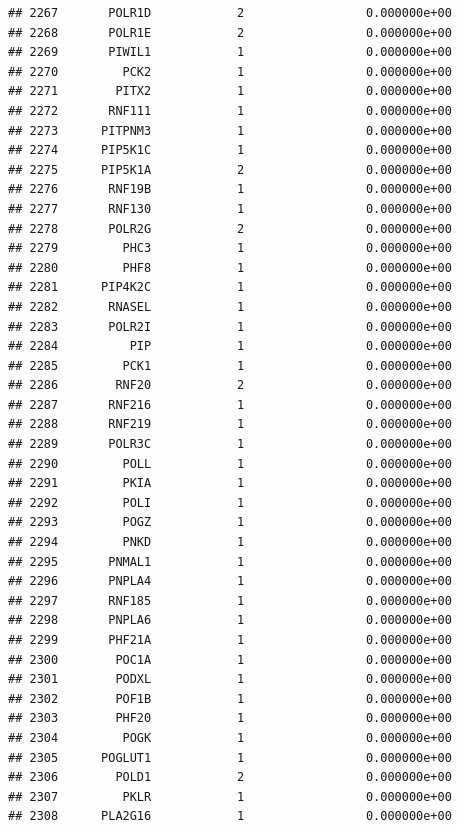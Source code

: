 \documentclass[
]{article}
\begin{document}
\begin{verbatim}
## 2267       POLR1D            2                 0.000000e+00
## 2268       POLR1E            2                 0.000000e+00
## 2269       PIWIL1            1                 0.000000e+00
## 2270         PCK2            1                 0.000000e+00
## 2271        PITX2            1                 0.000000e+00
## 2272       RNF111            1                 0.000000e+00
## 2273      PITPNM3            1                 0.000000e+00
## 2274      PIP5K1C            1                 0.000000e+00
## 2275      PIP5K1A            2                 0.000000e+00
## 2276       RNF19B            1                 0.000000e+00
## 2277       RNF130            1                 0.000000e+00
## 2278       POLR2G            2                 0.000000e+00
## 2279         PHC3            1                 0.000000e+00
## 2280         PHF8            1                 0.000000e+00
## 2281      PIP4K2C            1                 0.000000e+00
## 2282       RNASEL            1                 0.000000e+00
## 2283       POLR2I            1                 0.000000e+00
## 2284          PIP            1                 0.000000e+00
## 2285         PCK1            1                 0.000000e+00
## 2286        RNF20            2                 0.000000e+00
## 2287       RNF216            1                 0.000000e+00
## 2288       RNF219            1                 0.000000e+00
## 2289       POLR3C            1                 0.000000e+00
## 2290         POLL            1                 0.000000e+00
## 2291         PKIA            1                 0.000000e+00
## 2292         POLI            1                 0.000000e+00
## 2293         POGZ            1                 0.000000e+00
## 2294         PNKD            1                 0.000000e+00
## 2295       PNMAL1            1                 0.000000e+00
## 2296       PNPLA4            1                 0.000000e+00
## 2297       RNF185            1                 0.000000e+00
## 2298       PNPLA6            1                 0.000000e+00
## 2299       PHF21A            1                 0.000000e+00
## 2300        POC1A            1                 0.000000e+00
## 2301        PODXL            1                 0.000000e+00
## 2302        POF1B            1                 0.000000e+00
## 2303        PHF20            1                 0.000000e+00
## 2304         POGK            1                 0.000000e+00
## 2305      POGLUT1            1                 0.000000e+00
## 2306        POLD1            2                 0.000000e+00
## 2307         PKLR            1                 0.000000e+00
## 2308      PLA2G16            1                 0.000000e+00

\end{verbatim}
\end{document}
